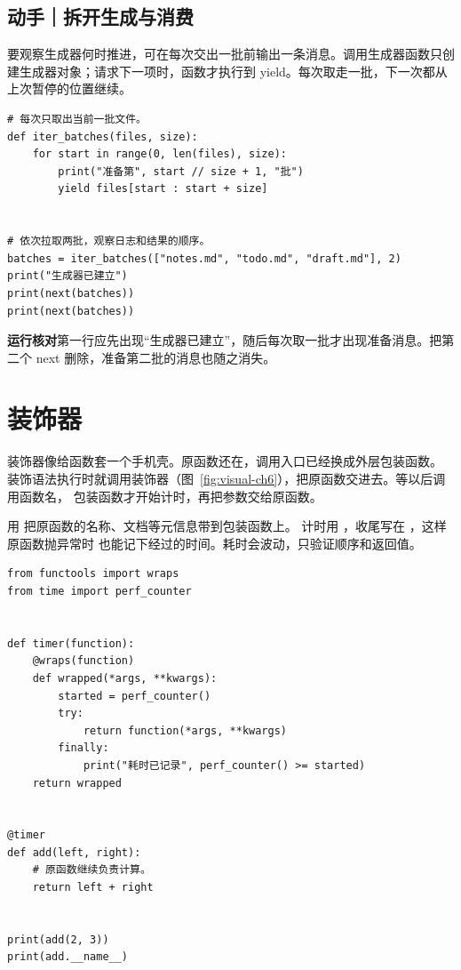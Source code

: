 \par

\subsection*{动手｜拆开生成与消费}

要观察生成器何时推进，可在每次交出一批前输出一条消息。调用生成器函数只创建生成器对象；请求下一项时，函数才执行到 yield。每次取走一批，下一次都从上次暂停的位置继续。

\begin{lstlisting}[title={\code{iter_batches.py}}]
# 每次只取出当前一批文件。
def iter_batches(files, size):
    for start in range(0, len(files), size):
        print("准备第", start // size + 1, "批")
        yield files[start : start + size]


# 依次拉取两批，观察日志和结果的顺序。
batches = iter_batches(["notes.md", "todo.md", "draft.md"], 2)
print("生成器已建立")
print(next(batches))
print(next(batches))
\end{lstlisting}

\textbf{运行核对}\enspace 第一行应先出现“生成器已建立”，随后每次取一批才出现准备消息。把第二个 next 删除，准备第二批的消息也随之消失。

\section{装饰器}

装饰器像给函数套一个手机壳。原函数还在，调用入口已经换成外层包装函数。
装饰语法执行时就调用装饰器（图~\ref{fig:visual-ch6}），把原函数交进去。等以后调用函数名，
包装函数才开始计时，再把参数交给原函数。

用  把原函数的名称、文档等元信息带到包装函数上。
计时用 ，收尾写在 ，这样原函数抛异常时
也能记下经过的时间。耗时会波动，只验证顺序和返回值。


\begin{lstlisting}[title={\code{timed_call.py}}]
from functools import wraps
from time import perf_counter


def timer(function):
    @wraps(function)
    def wrapped(*args, **kwargs):
        started = perf_counter()
        try:
            return function(*args, **kwargs)
        finally:
            print("耗时已记录", perf_counter() >= started)
    return wrapped


@timer
def add(left, right):
    # 原函数继续负责计算。
    return left + right


print(add(2, 3))
print(add.__name__)
\end{lstlisting}


